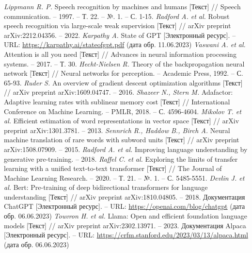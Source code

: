 \begin{thebibliography}{99}
  \textit{Lippmann R. P.} Speech recognition by machines and humans [Текст] // Speech communication. – 1997. – Т. 22. – №. 1. – С. 1-15.
  \textit{Radford A. et al.} Robust speech recognition via large-scale weak supervision [Текст] // arXiv preprint arXiv:2212.04356. – 2022.
  \textit{Karpathy A.} State of GPT [Электронный ресурс]. -- URL: \url{https://karpathy.ai/stateofgpt.pdf} (дата обр. 11.06.2023)
  \textit{Vaswani A. et al.} Attention is all you need [Текст] // Advances in neural information processing systems. – 2017. – Т. 30.
  \textit{Hecht-Nielsen R.} Theory of the backpropagation neural network [Текст] // Neural networks for perception. – Academic Press, 1992. – С. 65-93.
  \textit{Ruder S.} An overview of gradient descent optimization algorithms [Текст] // arXiv preprint arXiv:1609.04747. – 2016.
  \textit{Shazeer N., Stern M.} Adafactor: Adaptive learning rates with sublinear memory cost [Текст] // International Conference on Machine Learning. – PMLR, 2018. – С. 4596-4604.
  \textit{Mikolov T. et al.} Efficient estimation of word representations in vector space [Текст] // arXiv preprint arXiv:1301.3781. – 2013.
  \textit{Sennrich R., Haddow B., Birch A.} Neural machine translation of rare words with subword units [Текст] // arXiv preprint arXiv:1508.07909. – 2015.
  \textit{Radford A. et al.} Improving language understanding by generative pre-training. – 2018.
  \textit{Raffel C. et al.} Exploring the limits of transfer learning with a unified text-to-text transformer [Текст] // The Journal of Machine Learning Research. – 2020. – Т. 21. – №. 1. – С. 5485-5551.
  \textit{Devlin J. et al.} Bert: Pre-training of deep bidirectional transformers for language understanding [Текст] // arXiv preprint arXiv:1810.04805. – 2018.
  Документация ChatGPT [Электронный ресурс]. -- URL: \url{https://openai.com/blog/chatgpt} (дата обр. 06.06.2023)
  \textit{Touvron H. et al.} Llama: Open and efficient foundation language models [Текст] // arXiv preprint arXiv:2302.13971. – 2023.
  Документация Alpaca [Электронный ресурс]. -- URL: \url{https://crfm.stanford.edu/2023/03/13/alpaca.html} (дата обр. 06.06.2023)

\end{thebibliography}
